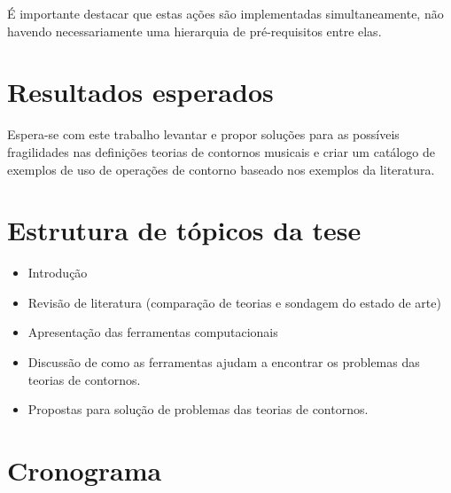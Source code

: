 \documentclass[12pt]{article}
\begin{document}
É importante destacar que estas ações são implementadas
simultaneamente, não havendo necessariamente uma hierarquia de
pré-requisitos entre elas.

\section{Resultados esperados}
\label{sec:resultados-esperados}

Espera-se com este trabalho levantar e propor soluções para as
possíveis fragilidades nas definições teorias de contornos musicais e
criar um catálogo de exemplos de uso de operações de contorno baseado
nos exemplos da literatura.

\section{Estrutura de tópicos da tese}
\label{sec:estrutura-de-topicos}

\begin{itemize}
\item Introdução
\item Revisão de literatura (comparação de teorias e sondagem do
  estado de arte)
\item Apresentação das ferramentas computacionais
\item Discussão de como as ferramentas ajudam a encontrar os problemas
  das teorias de contornos.
\item Propostas para solução de problemas das teorias de contornos.
\end{itemize}

\section{Cronograma}
\label{sec:cronograma}
\end{document}
